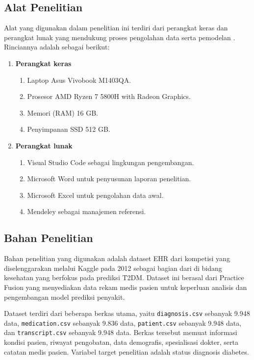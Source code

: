 \subsection{Alat Penelitian}
Alat yang digunakan dalam penelitian ini terdiri dari perangkat keras dan perangkat lunak yang mendukung proses pengolahan data serta pemodelan . Rinciannya adalah sebagai berikut:
\begin{enumerate}
\item \textbf{Perangkat keras}
  \begin{enumerate}[label=\alph*.]
  \item Laptop Asus Vivobook M1403QA.
  \item Prosesor AMD Ryzen 7 5800H with Radeon Graphics.
  \item Memori (RAM) 16 GB.
  \item Penyimpanan SSD 512 GB.
  \end{enumerate}
\item \textbf{Perangkat lunak}
  \begin{enumerate}[label=\alph*.]
  \item Visual Studio Code sebagai lingkungan pengembangan.
  \item Microsoft Word untuk penyusunan laporan penelitian.
  \item Microsoft Excel untuk pengolahan data awal.
  \item Mendeley sebagai manajemen referensi.
  \end{enumerate}
\end{enumerate}

\subsection{Bahan Penelitian}
Bahan penelitian yang digunakan adalah dataset EHR dari kompetisi  yang diselenggarakan melalui Kaggle pada 2012 sebagai bagian dari  di bidang kesehatan yang berfokus pada prediksi T2DM. Dataset ini berasal dari Practice Fusion yang menyediakan data rekam medis pasien untuk keperluan analisis dan pengembangan model prediksi penyakit.

Dataset terdiri dari beberapa berkas utama, yaitu \texttt{diagnosis.csv} sebanyak 9.948 data, \texttt{medication.csv} sebanyak 9.836 data, \texttt{patient.csv} sebanyak 9.948 data, dan \texttt{transcript.csv} sebanyak 9.948 data. Berkas tersebut memuat informasi kondisi pasien, riwayat pengobatan, data demografis, spesialisasi dokter, serta catatan medis pasien. Variabel target penelitian adalah status diagnosis diabetes.

